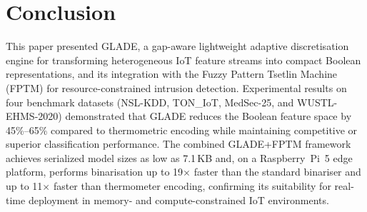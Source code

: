\documentclass[journal,twoside,web]{ieeecolor}
\begin{document}
\section{Conclusion}
\label{sec:conclusion}

This paper presented GLADE, a gap-aware lightweight adaptive
discretisation engine for transforming heterogeneous IoT feature
streams into compact Boolean representations, and its integration
with the Fuzzy Pattern Tsetlin Machine (FPTM) for resource-constrained
intrusion detection. Experimental results on four benchmark datasets
(NSL-KDD, TON\_IoT, MedSec-25, and WUSTL-EHMS-2020) demonstrated
that GLADE reduces the Boolean feature space by 45\%--65\% compared
to thermometric encoding while maintaining competitive or superior
classification performance. The combined GLADE+FPTM framework
achieves serialized model sizes as low as 7.1\,KB and, on a
Raspberry~Pi~5 edge platform, performs binarisation up to 19$\times$
faster than the standard binariser and up to 11$\times$ faster than
thermometer encoding, confirming its suitability for real-time
deployment in memory- and compute-constrained IoT environments.



\end{document}
